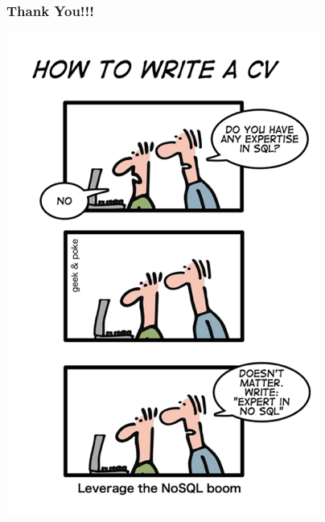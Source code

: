 \documentclass{beamer}
\begin{document}
\begin{frame}\frametitle{Thank You!!!}
\includegraphics[scale=.35]{nosql-expert.png}
\end{frame}
\end{document}
